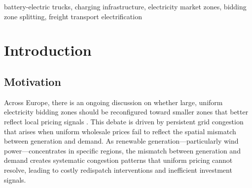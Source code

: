 \documentclass[conference]{IEEEtran}
\begin{document}
\begin{abstract} 
Market zone splits are an effective measure for reducing congestion caused by spatially imbalanced generation and demand. A prominent example is the proposed division of the German electricity market into northern and southern bidding zones, separating regions of surplus generation from those of high demand, which would yield lower electricity prices in the North and higher prices in the South. The impacts of this specific split would be substantial to the long-term developments of the electricity system and the consuming sectors --- not only within the two regions but also in neighboring countries. For interregional battery-electric trucks, this could affect where they charge. It is yet unknown what the magnitudes of this imbalance would be. The objective of this paper is to address this research gap by quantifying the impact of a potential German electricity bidding zone split on the spatial distribution of charging infrastructure required for long-haul battery-electric trucks. We assess this effect with a cost-optimization model for fleet turnover and charging allocation of battery-electric trucks transporting freight along the North--South axis of Germany. Results show that such a zone split affects the spatially dependent adoption patterns, and the spatial allocation of charging demand shifts substantially in the North. This redistribution propagates beyond the German borders, affecting the required charging capacity in neighboring countries. 
\end{abstract}

\begin{IEEEkeywords}
battery-electric trucks, charging infrastructure, electricity market zones, bidding zone splitting, freight transport electrification
\end{IEEEkeywords}

\section{Introduction}
\subsection{Motivation}

Across Europe, there is an ongoing discussion on whether large, uniform electricity bidding zones should be reconfigured toward smaller zones that better reflect local pricing signals \cite{b_moretto2026, b_knorr2025}. This debate is driven by persistent grid congestion that arises when uniform wholesale prices fail to reflect the spatial mismatch between generation and demand. As renewable generation---particularly wind power---concentrates in specific regions, the mismatch between generation and demand creates systematic congestion patterns that uniform pricing cannot resolve, leading to costly redispatch interventions and inefficient investment signals.
\end{document}
